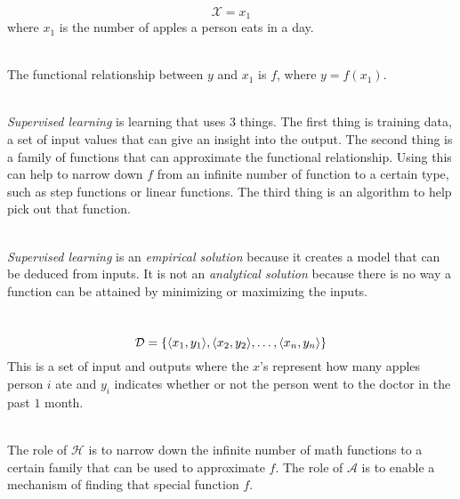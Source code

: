 \documentclass[12pt]{article}
\begin{document}
\begin{enumerate}
\newpage
{} \\
$$\mathcal{X} = x_1$$ 
where $x_1$ is the number of apples a person eats in a day. 

 \\
The functional relationship between $y$ and $x_1$ is $f$, where $y = f(x_1)$. 


 \\
\emph{Supervised learning} is learning that uses $3$ things. The first thing is training data, a set of input values that can give an insight into the output. The second thing is a family of functions that can approximate the functional relationship. Using this can help to narrow down $f$ from an infinite number of function to a certain type, such as step functions or linear functions. The third thing is an algorithm to help pick out that function.  

 \\
\emph{Supervised learning} is an \emph{empirical solution} because it creates a model that can be deduced from inputs. It is not an \emph{analytical solution} because there is no way a function can be attained by minimizing or maximizing the inputs. 

 \\
$$ \mathcal{D} = \left\{ \langle x_1, y_1 \rangle, \langle x_2, y_2 \rangle, \dots, \langle x_n, y_n \rangle\right\} $$ 
This is a set of input and outputs where the $x$'s represent how many apples person $i$ ate and $y_i$ indicates whether or not the person went to the doctor in the past $1$ month. 

 \\
The role of $\mathcal{H}$ is to narrow down the infinite number of math functions to a certain family that can be used to approximate $f$. The role of $\mathcal{A}$ is to enable a mechanism of finding that special function $f$. 


\end{enumerate}
\end{document}
